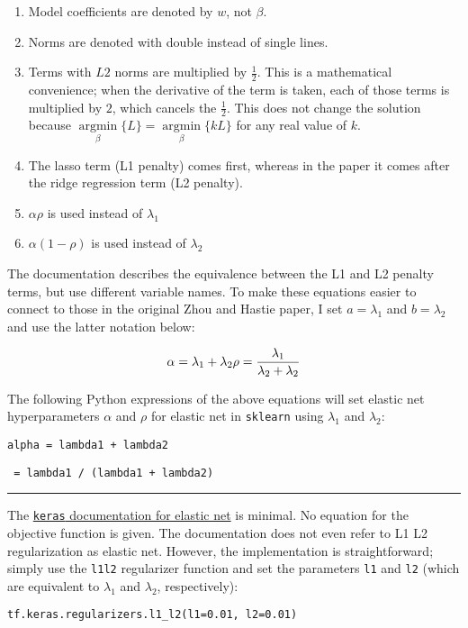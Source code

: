\begin{enumerate}
    \item Model coefficients are denoted by $w$, not $\beta$.
    \item Norms are denoted with double instead of single lines.
    \item Terms with $L2$ norms are multiplied by $\frac{1}{2}$. This is a mathematical convenience; when the derivative of the term is taken, each of those terms is multiplied by $2$, which cancels the $\frac{1}{2}$. This does not change the solution because 
$ \underset{\beta}{\operatorname{argmin}} \{ L \} = \underset{\beta}{\operatorname{argmin}} \{ kL \} $ for any real value of $k$.
    \item The lasso term (L1 penalty) comes first, whereas in the paper it comes after the ridge regression term (L2 penalty).
    \item $\alpha \rho$ is used instead of $\lambda_{1}$
    \item $\alpha (1-\rho)$ is used instead of $\lambda_{2}$
\end{enumerate}

The documentation describes the equivalence between the L1 and L2 penalty terms, but use different variable names. To make these equations easier to connect to those in the original Zhou and Hastie paper, I set $a=\lambda_{1}$ and $b=\lambda_{2}$ and use the latter notation below:

$$
\alpha = \lambda_{1} + \lambda_{2} \\
\rho = \frac{\lambda_{1}}{\lambda_{2} + \lambda_{2}}\\
$$

The following Python expressions of the above equations will set elastic net hyperparameters $\alpha$ and $\rho$ for elastic net in \texttt{sklearn} using $\lambda_{1}$ and $\lambda_{2}$:


\texttt{alpha = lambda1 + lambda2}

\texttt{ = lambda1 / (lambda1 + lambda2)}

\par\noindent\rule{\textwidth}{1pt}

The \href{https://keras.io/api/layers/regularizers/}{\texttt{keras} documentation for elastic net} is minimal. No equation for the objective function is given. The documentation does not even refer to L1 L2 regularization as elastic net. However, the implementation is straightforward; simply use the \texttt{l1\textunderscore l2} regularizer function and set the parameters \texttt{l1} and \texttt{l2} (which are equivalent to $\lambda_{1}$ and $\lambda_{2}$, respectively):

\texttt{tf.keras.regularizers.l1_l2(l1=0.01, l2=0.01)}
